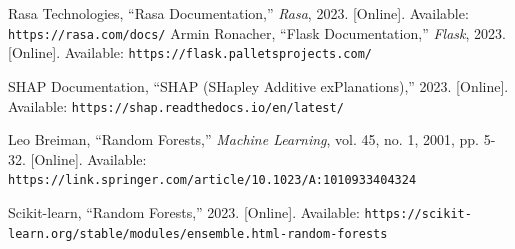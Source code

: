 \documentclass[a4paper,12pt]{article}
\begin{document}
\begin{thebibliography}{9}

Rasa Technologies, ``Rasa Documentation,'' \textit{Rasa}, 2023. [Online]. Available: \texttt{https://rasa.com/docs/}
Armin Ronacher, ``Flask Documentation,'' \textit{Flask}, 2023. [Online]. Available: \texttt{https://flask.palletsprojects.com/}


SHAP Documentation, ``SHAP (SHapley Additive exPlanations),'' 2023. [Online]. Available: \texttt{https://shap.readthedocs.io/en/latest/}

Leo Breiman, ``Random Forests,'' \textit{Machine Learning}, vol. 45, no. 1, 2001, pp. 5-32. [Online]. Available: \texttt{https://link.springer.com/article/10.1023/A:1010933404324}

Scikit-learn, ``Random Forests,'' 2023. [Online]. Available: \texttt{https://scikit-learn.org/stable/modules/ensemble.html-random-forests}

\end{thebibliography}
\end{document}
